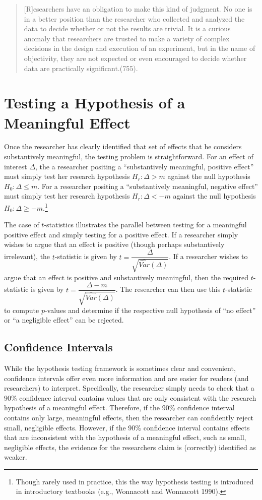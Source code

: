 \documentclass[12pt]{article}
\begin{document}
\begin{quote}
[R]esearchers have an obligation to make this kind of judgment. No one is in a better position than the researcher who collected and analyzed the data to decide whether or not the results are trivial. It is a curious anomaly that researchers are trusted to make a variety of complex decisions in the design and execution of an experiment, but in the name of objectivity, they are not expected or even encouraged to decide whether data are practically significant.(755).
\end{quote}

\section*{Testing a Hypothesis of a Meaningful Effect}

Once the researcher has clearly identified that set of effects that he considers substantively meaningful, the testing problem is straightforward. For an effect of interest $\Delta$, the a researcher positing a ``substantively meaningful, positive effect'' must simply test her research hypothesis $H_r: \Delta > m$ against the null hypothesis $H_0: \Delta \leq m$. For a researcher positing a ``substantively meaningful, negative effect'' must simply test her research hypothesis $H_r: \Delta < -m$ against the null hypothesis $H_0: \Delta \geq -m$.\footnote{Though rarely used in practice, this the way hypothesis testing is introduced in introductory textbooks (e.g., Wonnacott and Wonnacott 1990).}

The case of $t$-statistics illustrates the parallel between testing for a meaningful positive effect and simply testing for a positive effect. If a researcher simply wishes to argue that an effect is positive (though perhaps substantively irrelevant), the $t$-statistic is given by $t = \dfrac{\Delta}{\sqrt{\widehat{Var}(\Delta)}}$. If a researcher wishes to argue that an effect is positive and substantively meaningful, then the required $t$-statistic is given by $t = \dfrac{\Delta - m}{\sqrt{\widehat{Var}(\Delta)}}$. The researcher can then use this $t$-statistic to compute $p$-values and determine if the respective null hypothesis of ``no effect'' or ``a negligible effect'' can be rejected.

\subsection*{Confidence Intervals}

While the hypothesis testing framework is sometimes clear and convenient, confidence intervals offer even more information and are easier for readers (and researchers) to interpret. Specifically, the researcher simply needs to check that a 90\% confidence interval contains values that are only consistent with the research hypothesis of a meaningful effect. Therefore, if the 90\% confidence interval contains only large, meaningful effects, then the researcher can confidently reject small, negligible effects. However, if the 90\% confidence interval contains effects that are inconsistent with the hypothesis of a meaningful effect, such as small, negligible effects, the evidence for the researchers claim is (correctly) identified as weaker. 
\end{document}
